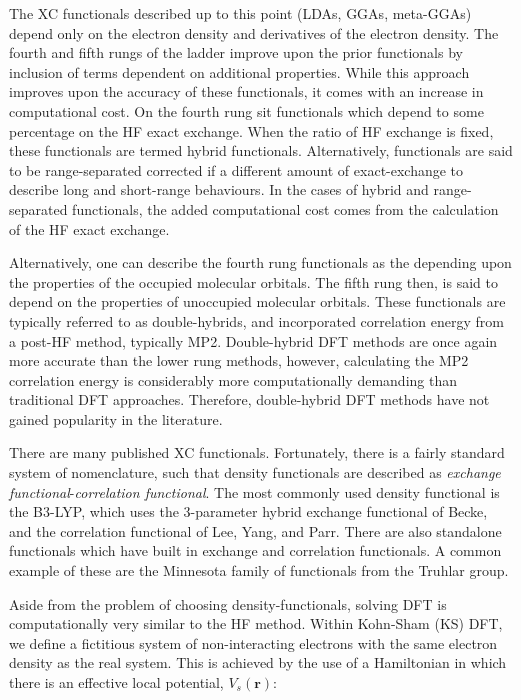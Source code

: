 The XC functionals described up to this point (LDAs, GGAs, meta-GGAs) depend only on the electron density and derivatives of the electron density. The fourth and fifth rungs of the ladder improve upon the prior functionals by inclusion of terms dependent on additional properties. While this approach improves upon the accuracy of these functionals, it comes with an increase in computational cost. On the fourth rung sit functionals which depend to some percentage on the HF exact exchange. When the ratio of HF exchange is fixed, these functionals are termed hybrid functionals. Alternatively, functionals are said to be range-separated corrected if a different amount of exact-exchange to describe long and short-range behaviours. In the cases of hybrid and range-separated functionals, the added computational cost comes from the calculation of the HF exact exchange.

Alternatively, one can describe the fourth rung functionals as the depending upon the properties of the occupied molecular orbitals. The fifth rung then, is said to depend on the properties of unoccupied molecular orbitals. These functionals are typically referred to as double-hybrids, and incorporated correlation energy from a post-HF method, typically MP2.\cite{Goerigk2014} Double-hybrid DFT methods are once again more accurate than the lower rung methods, however, calculating the MP2 correlation energy is considerably more computationally demanding than traditional DFT approaches. Therefore, double-hybrid DFT methods have not gained popularity in the literature.

There are many published XC functionals. Fortunately, there is a fairly standard system of nomenclature, such that density functionals are described as \emph{exchange functional}-\emph{correlation functional}. The most commonly used density functional is the  B3-LYP, which uses the 3-parameter hybrid exchange functional of Becke,\cite{Becke1993} and the correlation functional of Lee, Yang, and Parr.\cite{Lee1988} There are also standalone functionals which have built in exchange and correlation functionals. A common example of these are the Minnesota family of functionals from the Truhlar group.\cite{Zhao2006,Zhao2006a}

Aside from the problem of choosing density-functionals, solving DFT is computationally very similar to the HF method. Within Kohn-Sham (KS) DFT, we define a fictitious system of non-interacting electrons with the same electron density as the real system. This is achieved by the use of a Hamiltonian in which there is an effective local potential, $V_s(\mathbf{r})$:


